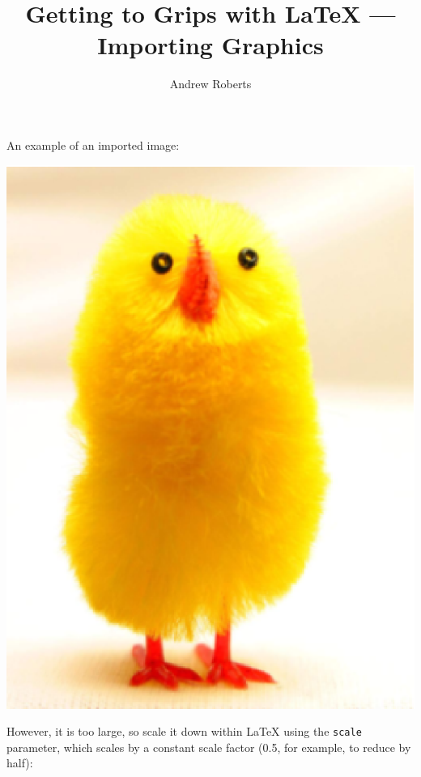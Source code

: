 \documentclass[english]{article}
\begin{document}
\title{Getting to Grips with \LaTeX{} --- Importing Graphics}
\author{Andrew Roberts}
\maketitle

An example of an imported image:

\begin{center}
  \includegraphics{chick}
\end{center}

However, it is too large, so scale it down within \LaTeX{} using the
\texttt{scale} parameter, which scales by a constant
scale factor (0.5, for example, to reduce by half):
\end{document}
